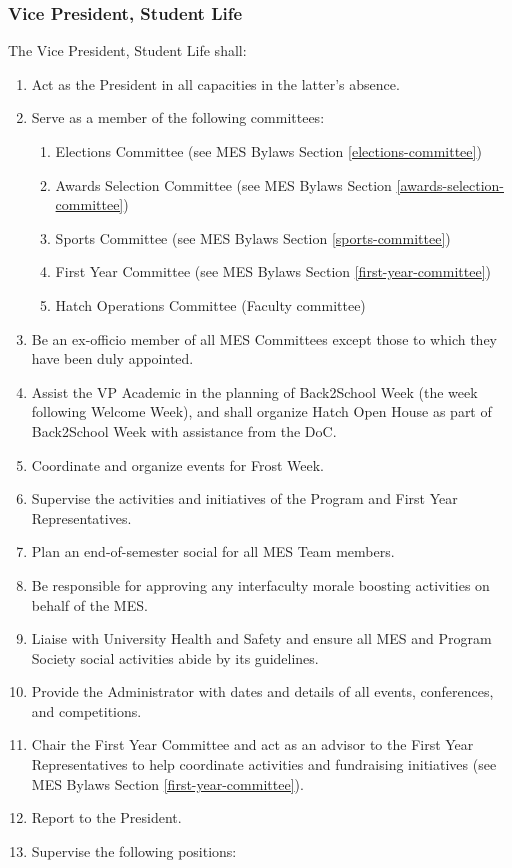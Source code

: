 \subsubsection{Vice President, Student
 Life}
\label{vice-president-student-life}
The Vice President, Student Life shall:

\begin{enumerate}
 \item
  Act as the President in all capacities in the latter's absence.
 \item
  Serve as a member of the following committees:

  \begin{enumerate}
   \item
    Elections Committee (see MES Bylaws Section \ref{elections-committee})
   \item
    Awards Selection Committee (see MES Bylaws Section \ref{awards-selection-committee})
   \item
    Sports Committee (see MES Bylaws Section \ref{sports-committee})
   \item
    First Year Committee (see MES Bylaws Section \ref{first-year-committee})
   \item
    Hatch Operations Committee (Faculty committee)
  \end{enumerate}
 \item
  Be an ex-officio member of all MES Committees except those to which they have been duly appointed.
 \item
  Assist the VP Academic in the planning of Back2School Week (the week following Welcome Week), and shall organize Hatch Open House as part of Back2School Week with assistance from the DoC.
 \item
  Coordinate and organize events for Frost Week.
 \item
  Supervise the activities and initiatives of the Program and First Year Representatives.
 \item
  Plan an end-of-semester social for all MES Team members.
 \item
  Be responsible for approving any interfaculty morale boosting activities on behalf of the MES.
 \item
  Liaise with University Health and Safety and ensure all MES and Program Society social activities abide by its guidelines.
 \item
  Provide the Administrator with dates and details of all events, conferences, and competitions.
 \item
  Chair the First Year Committee and act as an advisor to the First Year Representatives to help coordinate activities and fundraising initiatives (see MES Bylaws Section \ref{first-year-committee}).
 \item
  Report to the President.
 \item
  Supervise the following positions:


\end{enumerate}
